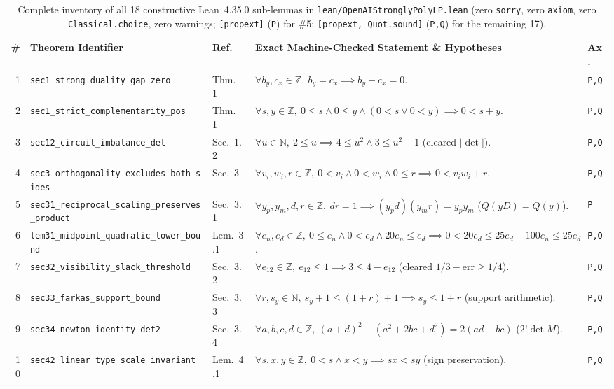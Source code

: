 \documentclass[10pt,twocolumn]{article}
\newcommand{\ZZ}{\mathbb{Z}}
\newcommand{\NN}{\mathbb{N}}
\begin{document}
\begin{table}[t]
\centering
\caption{Complete inventory of all 18 constructive Lean~4.35.0 sub-lemmas in \texttt{lean/OpenAIStronglyPolyLP.lean} (zero \texttt{sorry}, zero \texttt{axiom}, zero \texttt{Classical.choice}, zero warnings; \texttt{[propext]} (\texttt{P}) for \#5; \texttt{[propext, Quot.sound]} (\texttt{P,Q}) for the remaining 17).}
\label{tab:lean18}
\scriptsize
\setlength{\tabcolsep}{2.1pt}
\begin{tabular}{@{}r l l p{9.6cm} l@{}}
\toprule
\# & Theorem Identifier & Ref.~\cite{openai2026splp} & Exact Machine-Checked Statement \& Hypotheses & Ax. \\
\midrule
1 & \texttt{sec1\_strong\_duality\_gap\_zero} & Thm.~1 & $\forall b_y, c_x\in\ZZ,\ b_y=c_x \implies b_y - c_x = 0$. & \texttt{P,Q} \\
2 & \texttt{sec1\_strict\_complementarity\_pos} & Thm.~1 & $\forall s,y\in\ZZ,\ 0\le s \wedge 0\le y \wedge (0<s \vee 0<y) \implies 0 < s+y$. & \texttt{P,Q} \\
3 & \texttt{sec12\_circuit\_imbalance\_det} & Sec.~1.2 & $\forall u\in\NN,\ 2\le u \implies 4\le u^2 \wedge 3\le u^2-1$ (cleared $|\det|$). & \texttt{P,Q} \\
4 & \texttt{sec3\_orthogonality\_excludes\_both\_sides} & Sec.~3 & $\forall v_i,w_i,r\in\ZZ,\ 0<v_i \wedge 0<w_i \wedge 0\le r \implies 0 < v_i w_i + r$. & \texttt{P,Q} \\
5 & \texttt{sec31\_reciprocal\_scaling\_preserves\_product} & Sec.~3.1 & $\forall y_p,y_m,d,r\in\ZZ,\ dr=1 \implies (y_p d)(y_m r)=y_p y_m$ ($Q(yD)=Q(y)$). & \texttt{P} \\
6 & \texttt{lem31\_midpoint\_quadratic\_lower\_bound} & Lem.~3.1 & $\forall e_n,e_d\in\ZZ,\ 0\le e_n \wedge 0<e_d \wedge 20e_n\le e_d \implies 0<20e_d\le 25e_d-100e_n\le 25e_d$. & \texttt{P,Q} \\
7 & \texttt{sec32\_visibility\_slack\_threshold} & Sec.~3.2 & $\forall e_{12}\in\ZZ,\ e_{12}\le 1 \implies 3\le 4-e_{12}$ (cleared $1/3-\mathrm{err}\ge 1/4$). & \texttt{P,Q} \\
8 & \texttt{sec33\_farkas\_support\_bound} & Sec.~3.3 & $\forall r,s_y\in\NN,\ s_y+1\le (1+r)+1 \implies s_y\le 1+r$ (support arithmetic). & \texttt{P,Q} \\
9 & \texttt{sec34\_newton\_identity\_det2} & Sec.~3.4 & $\forall a,b,c,d\in\ZZ,\ (a+d)^2-(a^2+2bc+d^2)=2(ad-bc)$ ($2!\det M$). & \texttt{P,Q} \\
10 & \texttt{sec42\_linear\_type\_scale\_invariant} & Lem.~4.1 & $\forall s,x,y\in\ZZ,\ 0<s \wedge x<y \implies sx < sy$ (sign preservation). & \texttt{P,Q} \\

\end{tabular}
\end{table}
\end{document}

